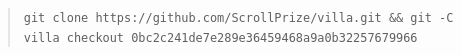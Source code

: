 \begin{quote}
\begin{Verbatim}[fontsize=\scriptsize,breaklines=true,breakanywhere=true,breakautoindent=false]
git clone https://github.com/ScrollPrize/villa.git && git -C villa checkout 0bc2c241de7e289e36459468a9a0b32257679966
\end{Verbatim}
\end{quote}

